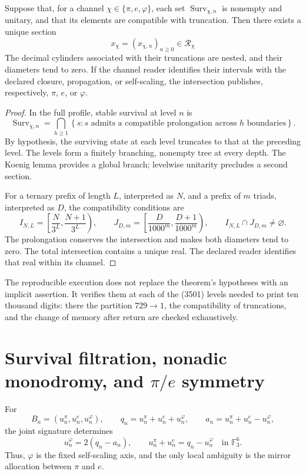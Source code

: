 \begin{theorem}
\label{thm:generacion-supervivencia-pi-e-phi-rev6}
Suppose that, for a channel
\(\chi\in\{\pi,e,\varphi\}\), each set
\(\operatorname{Surv}_{\chi,n}\) is nonempty and unitary, and that its elements
are compatible with truncation. Then there exists a unique section
\[
x_\chi=(x_{\chi,n})_{n\geq0}\in\mathcal R_\chi
\]
The decimal cylinders associated with their truncations are nested, and their
diameters tend to zero. If the channel reader identifies their intervals
with the declared closure, propagation, or self-scaling, the intersection
publishes, respectively, \(\pi\), \(e\), or \(\varphi\).
\end{theorem}

\begin{proof}
In the full profile, stable survival at level \(n\) is
\[
\operatorname{Surv}_{\chi,n}
=\bigcap_{h\geq1}
\left\{s:\text{\(s\) admits a compatible prolongation across \(h\) boundaries}\right\}.
\]
By hypothesis, the surviving state at each level truncates to that at the
preceding level. The levels form a finitely branching, nonempty tree
at every depth. The Koenig lemma provides a global branch;
levelwise unitarity precludes a second section.

For a ternary prefix of length \(L\), interpreted as \(N\), and a
prefix of \(m\) triads, interpreted as \(D\), the compatibility conditions are
\[
I_{N,L}=\left[\frac{N}{3^L},\frac{N+1}{3^L}\right),
\qquad
J_{D,m}=\left[\frac{D}{1000^m},\frac{D+1}{1000^m}\right),
\qquad
I_{N,L}\cap J_{D,m}\ne\varnothing .
\]
The prolongation conserves the intersection and makes both
diameters tend to zero. The total intersection contains a unique real. The declared
reader identifies that real within its channel.
\end{proof}

The reproducible execution does not replace the theorem's hypotheses with an
implicit assertion. It verifies them at each of the (3501) levels
needed to print ten thousand digits: there the partition \(729\to1\), the
compatibility of truncations, and the change of memory after return are
checked exhaustively.

\section{Survival filtration, nonadic monodromy, and \texorpdfstring{\(\pi/e\)}{pi/e} symmetry}

For
\[
B_n=(u_n^\pi,u_n^e,u_n^\varphi),\qquad
q_n=u_n^\pi+u_n^e+u_n^\varphi,\qquad
a_n=u_n^\pi+u_n^e-u_n^\varphi,
\]
the joint signature determines
\[
u_n^\varphi=2(q_n-a_n),\qquad
u_n^\pi+u_n^e=q_n-u_n^\varphi
\quad\text{in }\mathbb F_3^6.
\]
Thus, \(\varphi\) is the fixed self-scaling axis, and the only local ambiguity
is the mirror allocation between \(\pi\) and \(e\).

